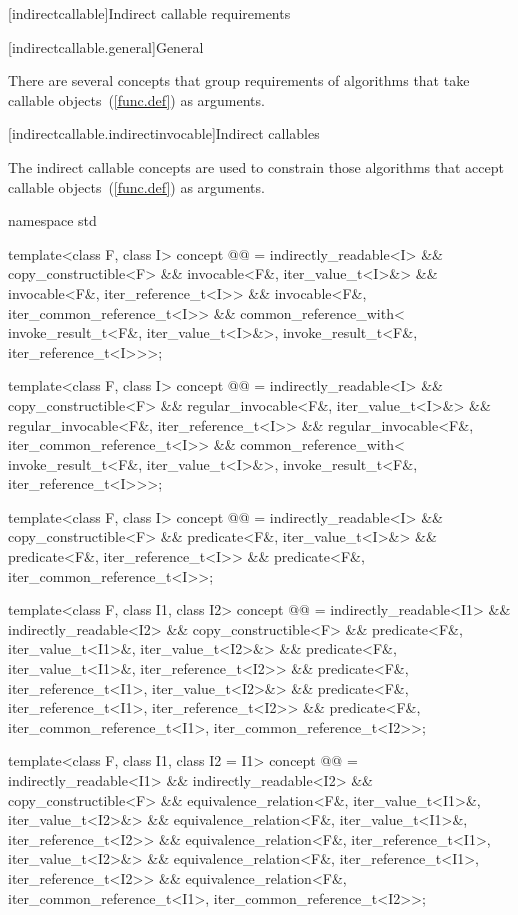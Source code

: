 [indirectcallable]{Indirect callable requirements}

[indirectcallable.general]{General}

\pnum
There are several concepts that group requirements of algorithms that
take callable objects~(\ref{func.def}) as arguments.

[indirectcallable.indirectinvocable]{Indirect callables}

\pnum
The indirect callable concepts are used to constrain those algorithms
that accept callable objects~(\ref{func.def}) as arguments.

\begin{codeblock}
namespace std {
  template<class F, class I>
    concept @@ =
      indirectly_readable<I> &&
      copy_constructible<F> &&
      invocable<F&, iter_value_t<I>&> &&
      invocable<F&, iter_reference_t<I>> &&
      invocable<F&, iter_common_reference_t<I>> &&
      common_reference_with<
        invoke_result_t<F&, iter_value_t<I>&>,
        invoke_result_t<F&, iter_reference_t<I>>>;

  template<class F, class I>
    concept @@ =
      indirectly_readable<I> &&
      copy_constructible<F> &&
      regular_invocable<F&, iter_value_t<I>&> &&
      regular_invocable<F&, iter_reference_t<I>> &&
      regular_invocable<F&, iter_common_reference_t<I>> &&
      common_reference_with<
        invoke_result_t<F&, iter_value_t<I>&>,
        invoke_result_t<F&, iter_reference_t<I>>>;

  template<class F, class I>
    concept @@ =
      indirectly_readable<I> &&
      copy_constructible<F> &&
      predicate<F&, iter_value_t<I>&> &&
      predicate<F&, iter_reference_t<I>> &&
      predicate<F&, iter_common_reference_t<I>>;

  template<class F, class I1, class I2>
    concept @@ =
      indirectly_readable<I1> && indirectly_readable<I2> &&
      copy_constructible<F> &&
      predicate<F&, iter_value_t<I1>&, iter_value_t<I2>&> &&
      predicate<F&, iter_value_t<I1>&, iter_reference_t<I2>> &&
      predicate<F&, iter_reference_t<I1>, iter_value_t<I2>&> &&
      predicate<F&, iter_reference_t<I1>, iter_reference_t<I2>> &&
      predicate<F&, iter_common_reference_t<I1>, iter_common_reference_t<I2>>;

  template<class F, class I1, class I2 = I1>
    concept @@ =
      indirectly_readable<I1> && indirectly_readable<I2> &&
      copy_constructible<F> &&
      equivalence_relation<F&, iter_value_t<I1>&, iter_value_t<I2>&> &&
      equivalence_relation<F&, iter_value_t<I1>&, iter_reference_t<I2>> &&
      equivalence_relation<F&, iter_reference_t<I1>, iter_value_t<I2>&> &&
      equivalence_relation<F&, iter_reference_t<I1>, iter_reference_t<I2>> &&
      equivalence_relation<F&, iter_common_reference_t<I1>, iter_common_reference_t<I2>>;

}
\end{codeblock}
